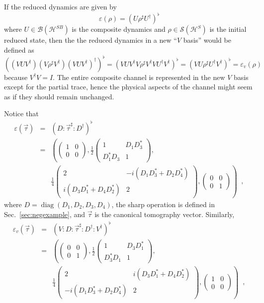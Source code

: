 If the reduced dynamics are given by
$$
\varepsilon(\rho) = \left(U\rho^\sharp U^\dagger\right)^\flat
$$
where $U\in\mathcal{B}(\mathcal{H}^{SB})$ is the composite dynamics and $\rho\in\mathcal{S}(\mathcal{H}^S)$ is the initial reduced state, then the the reduced dynamics in a new ``$V$ basis'' would be defined as
$$
\left(\left(V U V^\dagger \right)\left(V\rho^\sharp V^\dagger\right) \left(V U V^\dagger \right)^\dagger \right)^\flat = \left(V U V^\dagger V\rho^\sharp V^\dagger V U^\dagger V^\dagger \right)^\flat = \left(V U \rho^\sharp U^\dagger V^\dagger \right)^\flat = \varepsilon_v(\rho)
$$
because $V^\dagger V = I$.  The entire composite channel is represented in the new $V$ basis except for the partial trace, hence the physical aspects of the channel might seem as if they should remain unchanged.  

Notice that
\begin{eqnarray*}
\varepsilon(\vec{\tau}) &=& \left(D:\vec{\tau}^\sharp: D^\dagger\right)^\flat \\
&=& \left(\begin{pmatrix}
1&0\\
0&0\end{pmatrix},\frac{1}{2}\begin{pmatrix}
1&D_1 D_3^*\\
D_1^* D_3 & 1\end{pmatrix},\right. \\
& &\left. \frac{1}{4}\begin{pmatrix}
2&- i \left(D_1 D_3^* + D_2 D_4^*\right)\\
i \left(D_3 D_1^* + D_4 D_2^*\right)&2\end{pmatrix},\begin{pmatrix}
0&0\\
0&1\end{pmatrix}\right)\;\;,
\end{eqnarray*}
where $D=\operatorname{diag}(D_1,D_2,D_3,D_4)$, the sharp operation is defined in Sec.\ \ref{sec:negexample}, and $\vec{\tau}$ is the canonical tomography vector.  Similarly,
\begin{eqnarray*}
\varepsilon_v(\vec{\tau}) &=& \left(V:D:\vec{\tau}^\sharp: D^\dagger: V^\dagger\right)^\flat \\
&=& \left(\begin{pmatrix}
0&0\\
0&1\end{pmatrix},\frac{1}{2}\begin{pmatrix}
1&D_3 D_1^*\\
D_3^* D_1 & 1\end{pmatrix},\right. \\
& &\left.\frac{1}{4}\begin{pmatrix}
2& i \left(D_3 D_1^* + D_4 D_2^*\right)\\
- i \left(D_1 D_3^* + D_2 D_4^*\right)&2\end{pmatrix},\begin{pmatrix}
1&0\\
0&0\end{pmatrix}\right)\;\;,
\end{eqnarray*}
